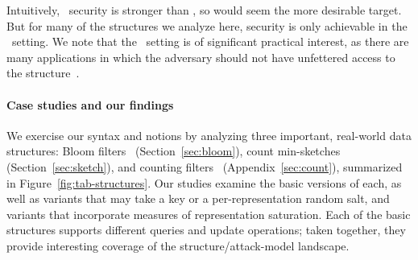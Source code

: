 Intuitively, \errep\
security is stronger than \erreps, so would seem the more desirable
target.  But for many of the structures we analyze here, security is only achievable in
the \erreps\ setting.
%
We note that the \erreps\ setting is of significant practical interest, as there are many
applications in which the adversary should not have unfettered access to the
structure~\cite{gerbet2015power}.


\paragraph{Case studies and our findings}
We exercise our syntax and notions by analyzing three important, real-world data
structures: Bloom filters~\cite{bloom1970space} (Section~\ref{sec:bloom}), count
min-sketches~\cite{cormode2005improved} (Section~\ref{sec:sketch}), and counting
filters~\cite{fan2000summary} (Appendix~\ref{sec:count}), summarized in
Figure~\ref{fig:tab-structures}. Our studies examine the basic
versions of each, as well as variants that may take a key or a
per-representation random salt, and variants that incorporate measures
of representation saturation.  Each of the basic structures supports different queries and
update operations; taken together, they provide interesting coverage
of the structure/attack-model landscape.

